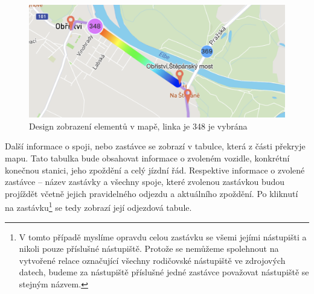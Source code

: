 \begin{figure}
\centering
  \includegraphics[width=0.5\linewidth]{../img/dve_vozidla.png}
  \caption{Design zobrazení elementů v mapě, linka je 348 je vybrána}
  \label{fig:dve_vozidla}
\end{figure}


Další informace o spoji, nebo zastávce se zobrazí v tabulce, která z části překryje mapu. Tato tabulka bude obsahovat informace o zvoleném vozidle, konkrétní konečnou stanici, jeho zpoždění a celý jízdní řád. Respektive informace o zvolené zastávce – název zastávky a všechny spoje, které zvolenou zastávkou budou projíždět včetně jejich pravidelného odjezdu a aktuálního zpoždění. Po kliknutí na zastávku\footnote{V tomto případě myslíme opravdu celou zastávku se všemi jejími nástupišti a nikoli pouze příslušné nástupiště. Protože se nemůžeme spolehnout na vytvořené relace označující všechny rodičovské nástupiště ve zdrojových datech, budeme za nástupiště příslušné jedné zastávce považovat nástupiště se stejným názvem.} se tedy zobrazí její odjezdová tabule.

